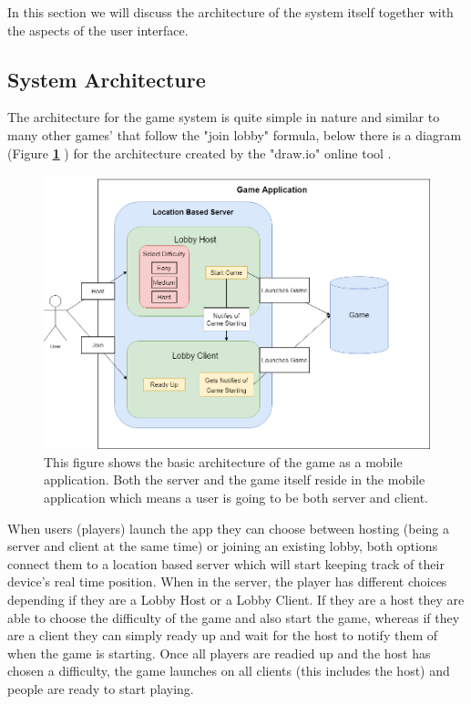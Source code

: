 \documentclass{dissertation}
\begin{document}
In this section we will discuss the architecture of the system itself together with the aspects of the user interface.

\subsection{System Architecture}

The architecture for the game system is quite simple in nature and similar to many other games' that follow the "join lobby" formula, below there is a diagram (Figure \textbf{\ref{fig:arch-diag}}
) for the architecture created by the "draw.io" online tool \citep{draw21}.



\begin{figure}[h]
\centering
\includegraphics[width = 14cm]{images/system_architecture.png}
\caption{This figure shows the basic architecture of the game as a mobile application. Both the server and the game itself reside in the mobile application which means a user is going to be both server and client.}
\label{fig:arch-diag}
\end{figure}



When users (players) launch the app they can choose between hosting (being a server and client at the same time) or joining an existing lobby, both options connect them to a location based server which will start keeping track of their device's real time position. When in the server, the player has different choices depending if they are a Lobby Host or a Lobby Client. If they are a host they are able to choose the difficulty of the game and also start the game, whereas if they are a client they can simply ready up and wait for the host to notify them of when the game is starting. Once all players are readied up and the host has chosen a difficulty, the game launches on all clients (this includes the host) and people are ready to start playing.
\end{document}
